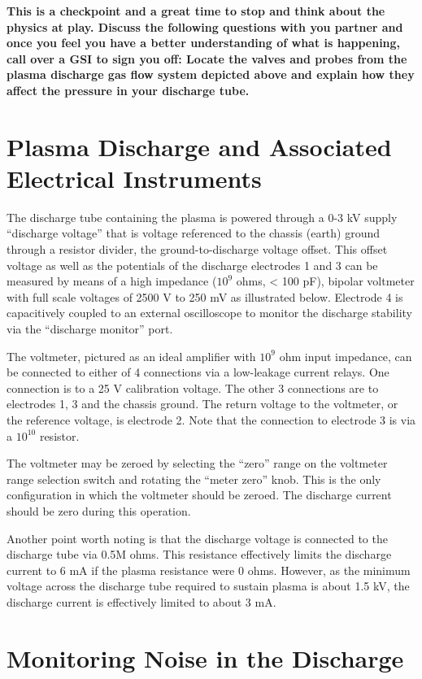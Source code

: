 \documentclass{../lab}
\begin{document}
\textbf{This is a checkpoint and a great time to stop and think about the physics at play. Discuss the following questions with you partner and once you feel you have a better understanding of what is happening, call over a GSI to sign you off:
Locate the valves and probes from the plasma discharge gas flow system depicted above and explain how they affect the pressure in your discharge tube.}

\section{Plasma Discharge and Associated Electrical Instruments}

The discharge tube containing the plasma is powered through a 0-3 kV supply ``discharge voltage'' that is voltage referenced to the chassis (earth) ground through a resistor divider, the ground-to-discharge voltage offset. This offset voltage as well as the potentials of the discharge electrodes 1 and 3 can be measured by means of a high impedance ($10^9$ ohms, < 100 pF), bipolar voltmeter with full scale voltages of 2500 V to 250 mV as illustrated below. Electrode 4 is capacitively coupled to an external oscilloscope to monitor the discharge stability via the ``discharge monitor'' port.

The voltmeter, pictured as an ideal amplifier with $10^9$ ohm input impedance, can be connected to either of 4 connections via a low-leakage current relays. One connection is to a 25 V calibration voltage. The other 3 connections are to electrodes 1, 3 and the chassis ground. The return voltage to the voltmeter, or the reference voltage, is electrode 2. Note that the connection to electrode 3 is via a $10^{10}$ resistor.

The voltmeter may be zeroed by selecting the ``zero'' range on the voltmeter range selection switch and rotating the ``meter zero'' knob. This is the only configuration in which the voltmeter should be zeroed. The discharge current should be zero during this operation.

Another point worth noting is that the discharge voltage is connected to the discharge tube via 0.5M ohms. This resistance effectively limits the discharge current to 6 mA if the plasma resistance were 0 ohms. However, as the minimum voltage across the discharge tube required to sustain plasma is about 1.5 kV, the discharge current is effectively limited to about 3 mA.

\section{Monitoring Noise in the Discharge}
\end{document}
